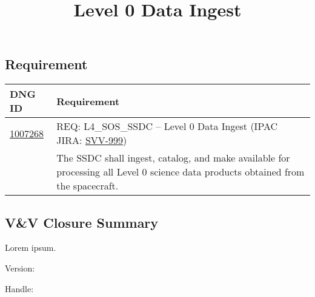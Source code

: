 \documentclass[TR]{spherex}
\title{Level 0 Data Ingest}
\begin{document}
\maketitlecompact


\subsection*{Requirement}

\begin{longtable}{|l|p{}|}
\hline
\textbf{DNG ID} & \textbf{Requirement} \\
\endhead
\hline
\href{https://cae-tracetree-spherex.jpl.nasa.gov/vi1007268.html}{1007268} &
REQ: L4\_SOS\_SSDC -- Level 0 Data Ingest (IPAC JIRA: \href{https://jira.ipac.caltech.edu/browse/SVV-999}{SVV-999}) \\
 & The SSDC shall ingest, catalog, and make available for processing all Level 0 science data products obtained from the spacecraft. \\
\hline
\end{longtable}

\subsection*{V\&V Closure Summary}

Lorem ipsum. %

Version: \theversion

Handle: \thehandle

% 
\end{document}
